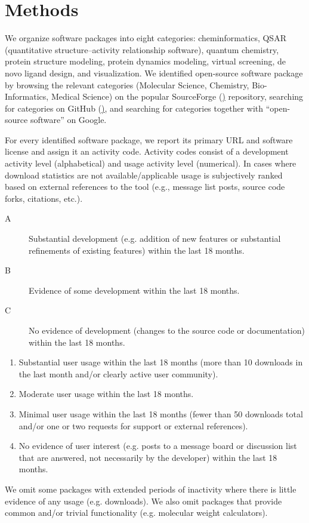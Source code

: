 \section{Methods}

We organize software packages into eight categories: cheminformatics, QSAR (quantitative structure–activity relationship software), quantum chemistry, protein structure modeling, protein dynamics modeling, virtual screening, de novo ligand design, and visualization.
We identified open-source software package by browsing the relevant categories (Molecular Science, Chemistry, Bio-Informatics, Medical Science) on the popular SourceForge (\href{http://sourceforge.net}) repository, searching for categories on GitHub (\href{http://github.com}), and searching for categories together with ``open-source software'' on Google.

For every identified software package, we report its primary URL and software license and assign it an activity code. Activity codes consist of a development activity level (alphabetical) and usage activity level (numerical). In cases where download statistics are not available/applicable usage is subjectively ranked based on external references to the tool (e.g., message list posts, source code forks, citations, etc.).
\begin{description}
  \item[A] Substantial development (e.g. addition of new features or substantial refinements of existing features) within the last 18 months.
  \item[B] Evidence of some development within the last 18 months.
  \item[C] No evidence of development (changes to the source code or documentation) within the last 18 months.
\end{description}
\begin{enumerate}
  \item Substantial user usage within the last 18 months (more than 10 downloads in the last month and/or clearly active user community).
  \item Moderate user usage within the last 18 months.
    \item Minimal user usage within the last 18 months (fewer than 50 downloads total and/or one or two requests for support or external references).
  \item No evidence of user interest (e.g. posts to a message board or discussion list that are answered, not necessarily by the developer) within the last 18 months.
\end{enumerate}

We omit some packages with extended periods of inactivity where there is little evidence of any usage (e.g. downloads).  We also omit packages that provide common and/or trivial functionality (e.g. molecular weight calculators).  



 
 

  
  
